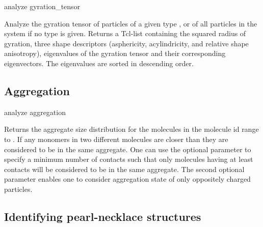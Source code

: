\begin{pysyntax}
\end{pysyntax}
\begin{essyntax}
  analyze gyration\_tensor  
\end{essyntax}
Analyze the gyration tensor of particles of a given type ,
or of all particles in the system if no type is given.
Returns a Tcl-list containing the squared radius of gyration,
 three shape descriptors (asphericity, acylindricity,
 and relative shape anisotropy), eigenvalues of the gyration tensor and their
corresponding eigenvectors. The eigenvalues are sorted in descending order.

\subsection{Aggregation}
\label{analyze:aggregation}

\begin{essyntax}
  analyze aggregation  
   
\end{essyntax}
Returns the aggregate size distribution for the molecules in the
molecule id range  to . If any
monomers in two different molecules are closer than
 they are considered to be in the same aggregate.
One can use the optional  parameter to specify a
minimum number of contacts such that only molecules having at least
 contacts will be considered to be in the same
aggregate. The second optional parameter 
enables one to consider aggregation state of only oppositely charged
particles.

\subsection{Identifying pearl-necklace structures}
\label{analyze:necklace}

